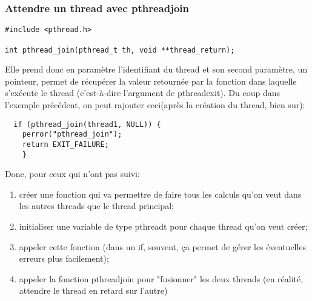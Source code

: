 \documentclass[a4paper]{article}
\begin{document}
\subsubsection{Attendre un thread avec pthread\textunderscore{}join}
\begin{lstlisting}
#include <pthread.h>

int pthread_join(pthread_t th, void **thread_return);
\end{lstlisting}
Elle prend donc en paramètre l'identifiant du thread et son second paramètre, un pointeur, permet de récupérer la valeur retournée par la fonction dans laquelle s'exécute le thread (c'est-à-dire l'argument de pthread\textunderscore{}exit).\newline
Du coup dans l'exemple précédent, on peut rajouter ceci(après la création du thread, bien sur):
\begin{lstlisting}
  if (pthread_join(thread1, NULL)) {
    perror("pthread_join");
    return EXIT_FAILURE;
    }
\end{lstlisting}
Donc, pour ceux qui n'ont pas suivi:
\begin{enumerate}
  \item créer une fonction qui va permettre de faire tous les calculs qu'on veut dans les autres threads que le thread principal;
  \item initialiser une variable de type pthread\textunderscore{}t pour chaque thread qu'on veut créer;
  \item appeler cette fonction (dans un if, souvent, ça permet de gérer les éventuelles erreurs plus facilement);
  \item appeler la fonction pthread\textunderscore{}join pour "fusionner" les deux threads (en réalité, attendre le thread en retard sur l'autre)
\end{enumerate}
\end{document}
